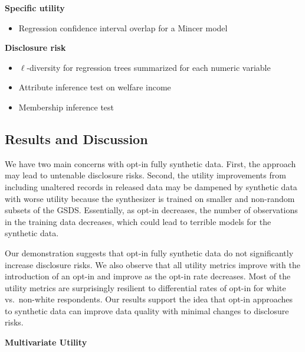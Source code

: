 \documentclass[
]{urban-formatting}
\providecommand{\tightlist}{%
  \setlength{\itemsep}{0pt}\setlength{\parskip}{0pt}}\usepackage{longtable,booktabs,array}
\begin{document}
\textbf{Specific utility}

\begin{itemize}
\tightlist
\item
  Regression confidence interval overlap for a Mincer model
\end{itemize}

\textbf{Disclosure risk}

\begin{itemize}
\tightlist
\item
  \(\ell\)-diversity for regression trees summarized for each numeric
  variable
\item
  Attribute inference test on welfare income
\item
  Membership inference test
\end{itemize}

\subsection{Results and Discussion}

We have two main concerns with opt-in fully synthetic data. First, the
approach may lead to untenable disclosure risks. Second, the utility
improvements from including unaltered records in released data may be
dampened by synthetic data with worse utility because the synthesizer is
trained on smaller and non-random subsets of the GSDS. Essentially, as
opt-in decreases, the number of observations in the training data
decreases, which could lead to terrible models for the synthetic data.

Our demonstration suggests that opt-in fully synthetic data do not
significantly increase disclosure risks. We also observe that all
utility metrics improve with the introduction of an opt-in and improve
as the opt-in rate decreases. Most of the utility metrics are
surprisingly resilient to differential rates of opt-in for white
vs.~non-white respondents. Our results support the idea that opt-in
approaches to synthetic data can improve data quality with minimal
changes to disclosure risks.

\textbf{Multivariate Utility}
\end{document}
